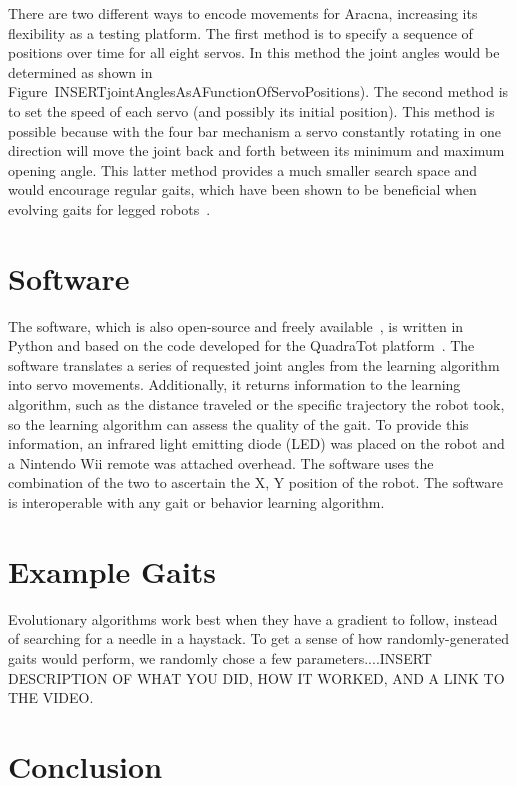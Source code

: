 \documentclass[letterpaper]{article}
\begin{document}
There are two different ways to encode movements for Aracna, increasing its flexibility as a testing platform. The first method is to specify a sequence of positions over time for all eight servos. In this method the joint angles would be determined as shown in Figure~INSERTjointAnglesAsAFunctionOfServoPositions). The second method is to set the speed of each servo (and possibly its initial position). This method is possible because with the four bar mechanism a servo constantly rotating in one direction will move the joint back and forth between its minimum and maximum opening angle. This latter method provides a much smaller search space and would encourage regular gaits, which have been shown to be beneficial when evolving gaits for legged robots~\citep{clune2011performance, hornby2005autonomous}.



\section{Software}

The software, which is also open-source and freely available~\citep{WEB}, is written in Python and based on the
code developed for the QuadraTot platform~\citep{yosinski2011gaits}. The software translates a series of requested joint angles from the learning algorithm into servo movements. Additionally, it returns information to the learning algorithm, such as the distance traveled or the specific trajectory the robot took, so the learning algorithm can assess the quality of the gait. To provide this information, an infrared light
emitting diode (LED) was placed on the robot and a Nintendo Wii
remote was attached overhead. The software uses the combination of the two to ascertain the X, Y position of the robot. The software is interoperable with any gait or behavior learning algorithm.



\section{Example Gaits}

Evolutionary algorithms work best when they have a gradient to follow, instead of searching for a needle in a haystack. To get a sense of how randomly-generated gaits would perform, we randomly chose a few parameters....INSERT DESCRIPTION OF WHAT YOU DID, HOW IT WORKED, AND A LINK TO THE VIDEO.



\section{Conclusion}
\end{document}
